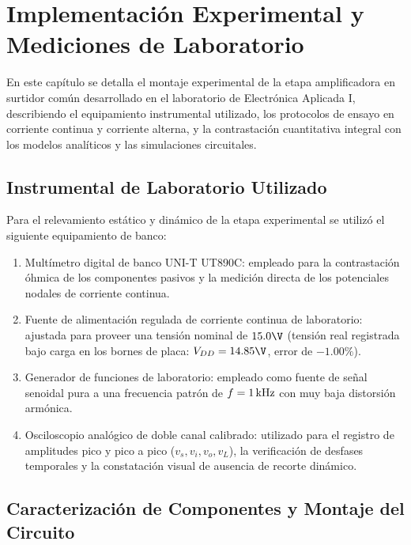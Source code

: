 \chapter{Implementación Experimental y Mediciones de Laboratorio}
\label{chap:mediciones_laboratorio}

En este capítulo se detalla el montaje experimental de la etapa amplificadora en surtidor común desarrollado en el
laboratorio de Electrónica Aplicada I, describiendo el equipamiento instrumental utilizado, los protocolos de ensayo en
corriente continua y corriente alterna, y la contrastación cuantitativa integral con los modelos analíticos y las
simulaciones circuitales.

\section{Instrumental de Laboratorio Utilizado}

Para el relevamiento estático y dinámico de la etapa experimental se utilizó el siguiente equipamiento de banco:
\begin{enumerate}
  \item Multímetro digital de banco UNI-T UT890C: empleado para la contrastación óhmica de los componentes pasivos y la
    medición directa de los potenciales nodales de corriente continua.
  \item Fuente de alimentación regulada de corriente continua de laboratorio: ajustada para proveer una tensión nominal
    de $15.0\V$ (tensión real registrada bajo carga en los bornes de placa: $V_{DD} = 14.85\V$, error de $-1.00\%$).
  \item Generador de funciones de laboratorio: empleado como fuente de señal senoidal pura a una frecuencia patrón de
    $f = 1\,\mathrm{kHz}$ con muy baja distorsión armónica.
  \item Osciloscopio analógico de doble canal calibrado: utilizado para el registro de amplitudes pico y pico a pico
    ($v_s, v_i, v_o, v_L$), la verificación de desfases temporales y la constatación visual de ausencia de recorte dinámico.
\end{enumerate}

\section{Caracterización de Componentes y Montaje del Circuito}


